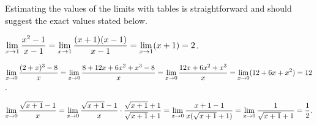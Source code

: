 \begin{activitySolution}
Estimating the values of the limits with tables is straightforward and should suggest the exact values stated below.
\ba
	\item $\displaystyle \lim_{x \to 1} \frac{x^2 - 1}{x-1} = \lim_{x \to 1} \frac{(x+1)(x-1)}{x-1} = \lim_{x \to 1} (x+1) = 2$. 
	\item $\displaystyle \lim_{x \to 0} \frac{(2+x)^3 - 8}{x} = \lim_{x \to 0} \frac{8 + 12x + 6x^2 + x^3 - 8}{x} = \lim_{x \to 0} \frac{12x + 6x^2 + x^3}{x} =  \lim_{x \to 0} (12 + 6x + x^2) = 12$.
	\item $\displaystyle \lim_{x \to 0} \frac{\sqrt{x+1} - 1}{x} = \lim_{x \to 0} \frac{\sqrt{x+1} - 1}{x} \cdot \frac{\sqrt{x+1} + 1}{\sqrt{x+1} + 1} = \lim_{x \to 0} \frac{x+1-1}{x(\sqrt{x+1}+1)} = \lim_{x \to 0} \frac{1}{\sqrt{x+1}+1} = \frac{1}{2}.$
\ea
\end{activitySolution}
\aftera
